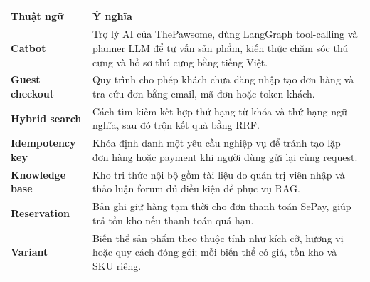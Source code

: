 \documentclass[../DoAn.tex]{subfiles}
\begin{document}
\begin{longtable}{l p{14cm}}
	\hline
   \textbf{Thuật ngữ}  & \textbf{Ý nghĩa} \\ \hline
	\textbf{Catbot} & Trợ lý AI của ThePawsome, dùng LangGraph tool-calling và planner LLM để tư vấn sản phẩm, kiến thức chăm sóc thú cưng và hồ sơ thú cưng bằng tiếng Việt. \\
	\textbf{Guest checkout} & Quy trình cho phép khách chưa đăng nhập tạo đơn hàng và tra cứu đơn bằng email, mã đơn hoặc token khách. \\
	\textbf{Hybrid search} & Cách tìm kiếm kết hợp thứ hạng từ khóa và thứ hạng ngữ nghĩa, sau đó trộn kết quả bằng RRF. \\
	\textbf{Idempotency key} & Khóa định danh một yêu cầu nghiệp vụ để tránh tạo lặp đơn hàng hoặc payment khi người dùng gửi lại cùng request. \\
	\textbf{Knowledge base} & Kho tri thức nội bộ gồm tài liệu do quản trị viên nhập và thảo luận forum đủ điều kiện để phục vụ RAG. \\
	\textbf{Reservation} & Bản ghi giữ hàng tạm thời cho đơn thanh toán SePay, giúp trả tồn kho nếu thanh toán quá hạn. \\
	\textbf{Variant} & Biến thể sản phẩm theo thuộc tính như kích cỡ, hương vị hoặc quy cách đóng gói; mỗi biến thể có giá, tồn kho và SKU riêng. \\

    \hline
\end{longtable}
\end{document}
